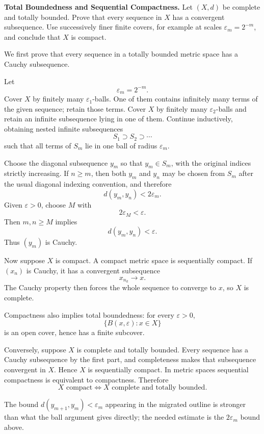 \begin{problem}[CP-II-0375]
\label{prob:cp-ii-0375}
\textbf{Total Boundedness and Sequential Compactness.}
Let \((X,d)\) be complete and totally bounded. Prove that every sequence in \(X\) has a convergent subsequence. Use successively finer finite covers, for example at scales \(\varepsilon_m=2^{-m}\), and conclude that \(X\) is compact.
\end{problem}

\begin{solution}
We first prove that every sequence in a totally bounded metric space has a Cauchy subsequence.

Let
\[
\varepsilon_m=2^{-m}.
\]
Cover \(X\) by finitely many \(\varepsilon_1\)-balls. One of them contains infinitely many
terms of the given sequence; retain those terms. Cover \(X\) by finitely many
\(\varepsilon_2\)-balls and retain an infinite subsequence lying in one of them. Continue
inductively, obtaining nested infinite subsequences
\[
S_1\supset S_2\supset\cdots
\]
such that all terms of \(S_m\) lie in one ball of radius \(\varepsilon_m\).

Choose the diagonal subsequence \(y_m\) so that \(y_m\in S_m\), with the original indices
strictly increasing. If \(n\ge m\), then both \(y_m\) and \(y_n\) may be chosen from \(S_m\)
after the usual diagonal indexing convention, and therefore
\[
d(y_m,y_n)<2\varepsilon_m.
\]
Given \(\varepsilon>0\), choose \(M\) with
\[
2\varepsilon_M<\varepsilon.
\]
Then \(m,n\ge M\) implies
\[
d(y_m,y_n)<\varepsilon.
\]
Thus \((y_m)\) is Cauchy.

Now suppose \(X\) is compact. A compact metric space is sequentially compact. If
\((x_n)\) is Cauchy, it has a convergent subsequence
\[
x_{n_k}\to x.
\]
The Cauchy property then forces the whole sequence to converge to \(x\), so \(X\) is complete.

Compactness also implies total boundedness: for every \(\varepsilon>0\),
\[
\{B(x,\varepsilon):x\in X\}
\]
is an open cover, hence has a finite subcover.

Conversely, suppose \(X\) is complete and totally bounded. Every sequence has a Cauchy
subsequence by the first part, and completeness makes that subsequence convergent in \(X\).
Hence \(X\) is sequentially compact. In metric spaces sequential compactness is equivalent
to compactness. Therefore
\[
\boxed{
X\text{ compact}
\iff
X\text{ complete and totally bounded}.
}
\]

The bound \(d(y_{m+1},y_m)<\varepsilon_m\) appearing in the migrated outline is stronger than
what the ball argument gives directly; the needed estimate is the \(2\varepsilon_m\) bound
above.
\end{solution}


